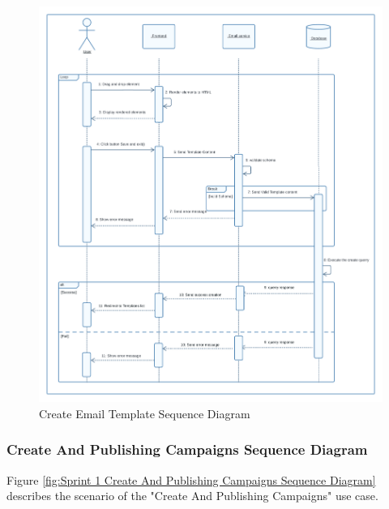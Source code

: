 \begin{figure}[ht]
	\centering
	\includegraphics[width=\linewidth]{Images/Sprint1/sequence diagram sprint 1/email building v1.png}
	\caption{ Create Email Template Sequence Diagram}
	\label{fig:Sprint 1 Create Email Template Sequence Diagram}
\end{figure}

\clearpage

\subsubsection{Create And Publishing Campaigns Sequence Diagram}

Figure \ref{fig:Sprint 1 Create And Publishing Campaigns Sequence Diagram} describes the scenario of the "Create And Publishing Campaigns" use case.

